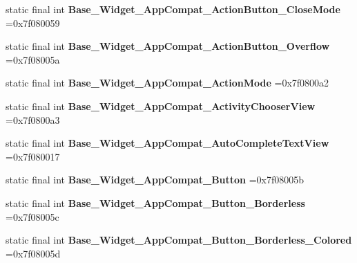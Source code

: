 \begin{DoxyCompactItemize}
\item 
\hypertarget{classcheck_1_1test_1_1_r_1_1style_af6777029489043a35d42facddc59373d}{}static final int {\bfseries Base\+\_\+\+Widget\+\_\+\+App\+Compat\+\_\+\+Action\+Button\+\_\+\+Close\+Mode} =0x7f080059\label{classcheck_1_1test_1_1_r_1_1style_af6777029489043a35d42facddc59373d}

\item 
\hypertarget{classcheck_1_1test_1_1_r_1_1style_a016be4e763e9d1634e3632a73229048a}{}static final int {\bfseries Base\+\_\+\+Widget\+\_\+\+App\+Compat\+\_\+\+Action\+Button\+\_\+\+Overflow} =0x7f08005a\label{classcheck_1_1test_1_1_r_1_1style_a016be4e763e9d1634e3632a73229048a}

\item 
\hypertarget{classcheck_1_1test_1_1_r_1_1style_a468d1d0e71a5deecdef174e8730955e2}{}static final int {\bfseries Base\+\_\+\+Widget\+\_\+\+App\+Compat\+\_\+\+Action\+Mode} =0x7f0800a2\label{classcheck_1_1test_1_1_r_1_1style_a468d1d0e71a5deecdef174e8730955e2}

\item 
\hypertarget{classcheck_1_1test_1_1_r_1_1style_a1b7821ac087cda0a2666c96a5d6b83a3}{}static final int {\bfseries Base\+\_\+\+Widget\+\_\+\+App\+Compat\+\_\+\+Activity\+Chooser\+View} =0x7f0800a3\label{classcheck_1_1test_1_1_r_1_1style_a1b7821ac087cda0a2666c96a5d6b83a3}

\item 
\hypertarget{classcheck_1_1test_1_1_r_1_1style_af2edabacfa1ddce4cf213689ca9d411e}{}static final int {\bfseries Base\+\_\+\+Widget\+\_\+\+App\+Compat\+\_\+\+Auto\+Complete\+Text\+View} =0x7f080017\label{classcheck_1_1test_1_1_r_1_1style_af2edabacfa1ddce4cf213689ca9d411e}

\item 
\hypertarget{classcheck_1_1test_1_1_r_1_1style_aaa3c6288f050b7a9beac603d44e5db69}{}static final int {\bfseries Base\+\_\+\+Widget\+\_\+\+App\+Compat\+\_\+\+Button} =0x7f08005b\label{classcheck_1_1test_1_1_r_1_1style_aaa3c6288f050b7a9beac603d44e5db69}

\item 
\hypertarget{classcheck_1_1test_1_1_r_1_1style_a292b0235c4551fb14c1214bcd3672b10}{}static final int {\bfseries Base\+\_\+\+Widget\+\_\+\+App\+Compat\+\_\+\+Button\+\_\+\+Borderless} =0x7f08005c\label{classcheck_1_1test_1_1_r_1_1style_a292b0235c4551fb14c1214bcd3672b10}

\item 
\hypertarget{classcheck_1_1test_1_1_r_1_1style_a765eff16042e6a2ffffd2301a810faa3}{}static final int {\bfseries Base\+\_\+\+Widget\+\_\+\+App\+Compat\+\_\+\+Button\+\_\+\+Borderless\+\_\+\+Colored} =0x7f08005d\label{classcheck_1_1test_1_1_r_1_1style_a765eff16042e6a2ffffd2301a810faa3}


\end{DoxyCompactItemize}
